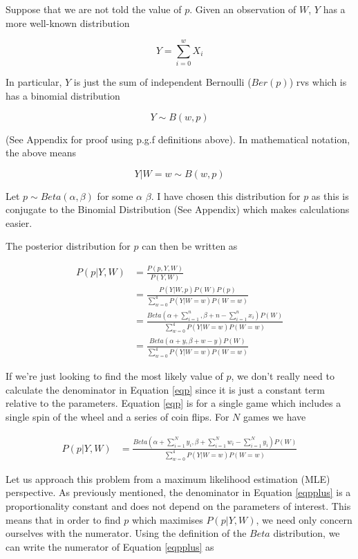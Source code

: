 \documentclass{article}
\begin{document}
\begin{flushleft}
Suppose that we are not told the value of $p$. Given an observation of $W$, $Y$ has a more well-known distribution

$$Y = \sum_{i=0}^w X_i$$

In particular, $Y$ is just the sum of independent Bernoulli ($Ber(p)$) rvs which is has a binomial distribution

$$Y \sim B(w,p)$$

(See Appendix for proof using p.g.f definitions above). In mathematical notation, the above means

$$Y|W=w \sim B(w,p)$$

Let $p \sim Beta(\alpha, \beta)$ for some $\alpha$ $\beta$. I have chosen this distribution for $p$ as this is conjugate to the Binomial Distribution (See Appendix) which makes calculations easier.\newline

The posterior distribution for $p$ can then be written as

\begin{equation} \label{eqp}
\begin{split}
P(p|Y,W) & = \frac{P(p,Y,W)}{P(Y,W)} \\
& = \frac{P(Y|W,p) P(W) P(p)}{\sum_{w=0}^4 P(Y|W=w) P(W=w)} \\
& = \frac{Beta(\alpha + \sum_{i=1}^n, \beta + n - \sum_{i=1}^n x_i) P(W)}{\sum_{w=0}^4 P(Y|W=w) P(W=w)} \\
& = \frac{Beta(\alpha + y, \beta + w - y) P(W)}{\sum_{w=0}^4 P(Y|W=w) P(W=w)}
\end{split}
\end{equation}

If we're just looking to find the most likely value of $p$, we don't really need to calculate the denominator in Equation \ref{eqp} since it is just a constant term relative to the parameters. Equation \ref{eqp} is for a single game which includes a single spin of the wheel and a series of coin flips. For $N$ games we have

\begin{equation} \label{eqpplus}
\begin{split}
P(p|Y,W) & = \frac{Beta(\alpha + \sum_{i=1}^N y_i, \beta + \sum_{i=1}^N w_i - \sum_{i=1}^N y_i) P(W)}{\sum_{w=0}^4 P(Y|W=w) P(W=w)}
\end{split}
\end{equation}

Let us approach this problem from a maximum likelihood estimation (MLE) perspective. As previously mentioned, the denominator in Equation \ref{eqpplus} is a proportionality constant and does not depend on the parameters of interest. This means that in order to find $p$ which maximises $P(p|Y,W)$, we need only concern ourselves with the numerator. Using the definition of the $Beta$ distribution, we can write the numerator of Equation \ref{eqpplus} as


\end{flushleft}
\end{document}
